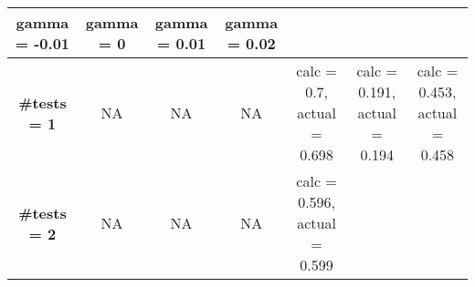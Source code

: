 \documentclass[
]{article}
\begin{document}
\begin{longtable}[]{@{}ccccccc@{}}
\begin{minipage}[b]{0.08\columnwidth}
gamma = -0.01\strut
\end{minipage} & \begin{minipage}[b]{0.16\columnwidth}\centering
gamma = 0\strut
\end{minipage} & \begin{minipage}[b]{0.16\columnwidth}\centering
gamma = 0.01\strut
\end{minipage} & \begin{minipage}[b]{0.16\columnwidth}\centering
gamma = 0.02\strut
\end{minipage}\tabularnewline
\midrule
\endhead
\begin{minipage}[t]{0.09\columnwidth}\centering
\textbf{\#tests = 1}\strut
\end{minipage} & \begin{minipage}[t]{0.08\columnwidth}\centering
NA\strut
\end{minipage} & \begin{minipage}[t]{0.08\columnwidth}\centering
NA\strut
\end{minipage} & \begin{minipage}[t]{0.08\columnwidth}\centering
NA\strut
\end{minipage} & \begin{minipage}[t]{0.16\columnwidth}\centering
calc = 0.7, actual = 0.698\strut
\end{minipage} & \begin{minipage}[t]{0.16\columnwidth}\centering
calc = 0.191, actual = 0.194\strut
\end{minipage} & \begin{minipage}[t]{0.16\columnwidth}\centering
calc = 0.453, actual = 0.458\strut
\end{minipage}\tabularnewline
\begin{minipage}[t]{0.09\columnwidth}\centering
\textbf{\#tests = 2}\strut
\end{minipage} & \begin{minipage}[t]{0.08\columnwidth}\centering
NA\strut
\end{minipage} & \begin{minipage}[t]{0.08\columnwidth}\centering
NA\strut
\end{minipage} & \begin{minipage}[t]{0.08\columnwidth}\centering
NA\strut
\end{minipage} & \begin{minipage}[t]{0.16\columnwidth}\centering
calc = 0.596, actual = 0.599\strut
\end{minipage} & \begin{minipage}[t]{0.16\columnwidth}\centering

\end{minipage}
\end{longtable}
\end{document}

